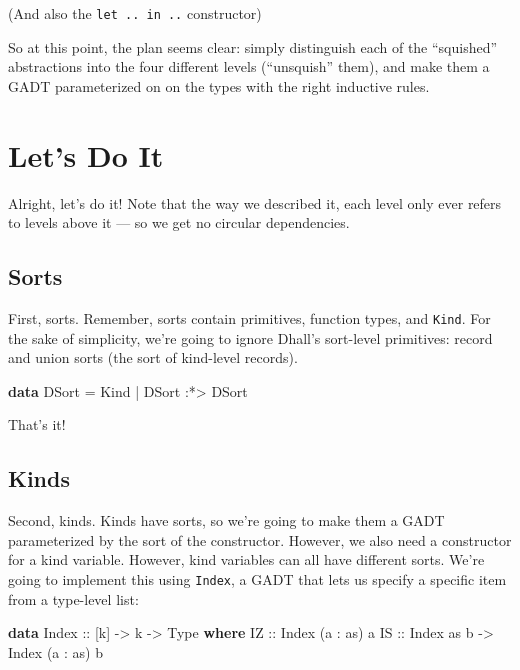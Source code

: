 \documentclass[]{article}
\newenvironment{Shaded}{}{}
\newcommand{\DataTypeTok}[1]{\textcolor[rgb]{0.56,0.13,0.00}{#1}}
\newcommand{\KeywordTok}[1]{\textcolor[rgb]{0.00,0.44,0.13}{\textbf{#1}}}
\newcommand{\NormalTok}[1]{#1}
\newcommand{\OperatorTok}[1]{\textcolor[rgb]{0.40,0.40,0.40}{#1}}
\newcommand{\OtherTok}[1]{\textcolor[rgb]{0.00,0.44,0.13}{#1}}
\begin{document}
(And also the \texttt{let\ ..\ in\ ..} constructor)

So at this point, the plan seems clear: simply distinguish each of the
``squished'' abstractions into the four different levels (``unsquish'' them),
and make them a GADT parameterized on on the types with the right inductive
rules.

\section{Let's Do It}\label{lets-do-it}

Alright, let's do it! Note that the way we described it, each level only ever
refers to levels above it --- so we get no circular dependencies.

\subsection{Sorts}\label{sorts}

First, sorts. Remember, sorts contain primitives, function types, and
\texttt{Kind}. For the sake of simplicity, we're going to ignore Dhall's
sort-level primitives: record and union sorts (the sort of kind-level records).

\begin{Shaded}
\begin{Highlighting}[]
\KeywordTok{data} \DataTypeTok{DSort} \OtherTok{=} \DataTypeTok{Kind}
           \OperatorTok{|} \DataTypeTok{DSort} \OperatorTok{:*\textgreater{}} \DataTypeTok{DSort}
\end{Highlighting}
\end{Shaded}

That's it!

\subsection{Kinds}\label{kinds}

Second, kinds. Kinds have sorts, so we're going to make them a GADT
parameterized by the sort of the constructor. However, we also need a
constructor for a kind variable. However, kind variables can all have different
sorts. We're going to implement this using \texttt{Index}, a GADT that lets us
specify a specific item from a type-level list:

\begin{Shaded}
\begin{Highlighting}[]
\KeywordTok{data} \DataTypeTok{Index}\OtherTok{ ::}\NormalTok{ [k] }\OtherTok{{-}\textgreater{}}\NormalTok{ k }\OtherTok{{-}\textgreater{}} \DataTypeTok{Type} \KeywordTok{where}
    \DataTypeTok{IZ}\OtherTok{ ::} \DataTypeTok{Index}\NormalTok{ (a \textquotesingle{}}\OperatorTok{:}\NormalTok{ as) a}
    \DataTypeTok{IS}\OtherTok{ ::} \DataTypeTok{Index}\NormalTok{ as b }\OtherTok{{-}\textgreater{}} \DataTypeTok{Index}\NormalTok{ (a \textquotesingle{}}\OperatorTok{:}\NormalTok{ as) b}
\end{Highlighting}
\end{Shaded}
\end{document}

